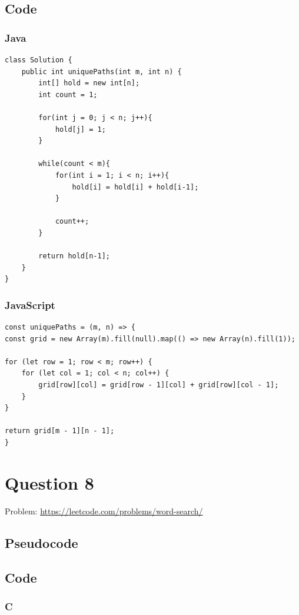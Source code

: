 \documentclass[11pt]{article}
\begin{document}
\subsection{Code}
\subsubsection{Java}

\begin{verbatim}
class Solution {
    public int uniquePaths(int m, int n) {
        int[] hold = new int[n];
        int count = 1;
        
        for(int j = 0; j < n; j++){
            hold[j] = 1;
        }

        while(count < m){
            for(int i = 1; i < n; i++){
                hold[i] = hold[i] + hold[i-1];
            }

            count++;
        }

        return hold[n-1];
    }
}
\end{verbatim}

\subsubsection{JavaScript}

\begin{verbatim}
const uniquePaths = (m, n) => {
const grid = new Array(m).fill(null).map(() => new Array(n).fill(1));

for (let row = 1; row < m; row++) {
    for (let col = 1; col < n; col++) {
        grid[row][col] = grid[row - 1][col] + grid[row][col - 1];
    }
}

return grid[m - 1][n - 1];
}
\end{verbatim}


\newpage

\section{Question 8}
Problem: \url{https://leetcode.com/problems/word-search/}

\subsection{Pseudocode}

\subsection{Code}
\subsubsection{C}
\end{document}
